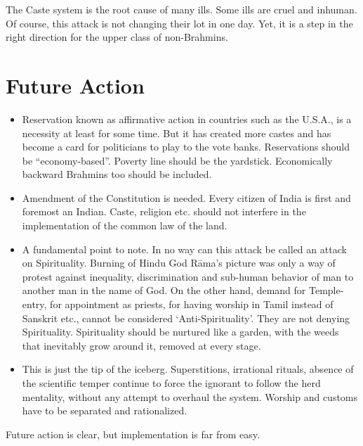 The Caste system is the root cause of many ills. Some ills are cruel and inhuman. Of course, this attack is not changing their lot in one day. Yet, it is a step in the right direction for the upper class of non-Brahmins.


\section{Future Action}

\begin{itemize}
\item Reservation known as affirmative action in countries such as the U.S.A., is a necessity at least for some time. But it has created more castes and has become a card for politicians to play to the vote banks. Reservations should be “economy-based”. Poverty line should be the yardstick. Economically backward Brahmins too should be included.

 \item Amendment of the Constitution is needed. Every citizen of India is first and foremost an Indian. Caste, religion etc. should not interfere in the implementation of the common law of the land.

 \item A fundamental point to note. In no way can this attack be called an attack on Spirituality. Burning of Hindu God Rāma’s picture was only a way of protest against inequality, discrimination and sub-human behavior of man to another man in the name of God. On the other hand, demand for Temple-entry, for appointment as priests, for having worship in Tamil instead of Sanskrit etc., cannot be considered ‘Anti-Spirituality’. They are not denying Spirituality. Spirituality should be nurtured like a garden, with the weeds that inevitably grow around it, removed at every stage.

 \item This is just the tip of the iceberg. Superstitions, irrational rituals, absence of the scientific temper continue to force the ignorant to follow the herd mentality, without any attempt to overhaul the system. Worship and customs have to be separated and rationalized.

\end{itemize}

Future action is clear, but implementation is far from easy.

